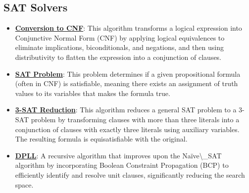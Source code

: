 \documentclass{article}%
\begin{document}
\subsection{SAT Solvers}%
\label{subsec:SATSolvers}%
\begin{itemize}[leftmargin=*]%
\item \href{https://purdue.brightspace.com/d2l/common/assets/pdfjs-d2l-dist/1.0.14-legacy/web/viewer.html?file=\%2Fcontent\%2Fenforced\%2F1095467-wl.202510.CS.24300.001\%2F13L1-Logic.pdf\%3Fou\%3D1095467\&lang=en-us\&container=d2l-fileviewer-rendered-pdf\&fullscreen=d2l-fileviewer-rendered-pdf-dialog\&height=667#page=17}{\textbf{Conversion to CNF}}: This algorithm transforms a logical expression into Conjunctive Normal Form (CNF) by applying logical equivalences to eliminate implications, biconditionals, and negations, and then using distributivity to flatten the expression into a conjunction of clauses.%
\item \href{https://purdue.brightspace.com/d2l/common/assets/pdfjs-d2l-dist/1.0.14-legacy/web/viewer.html?file=\%2Fcontent\%2Fenforced\%2F1095467-wl.202510.CS.24300.001\%2F13L1-Logic.pdf\%3Fou\%3D1095467\&lang=en-us\&container=d2l-fileviewer-rendered-pdf\&fullscreen=d2l-fileviewer-rendered-pdf-dialog\&height=667#page=15}{\textbf{SAT Problem}}: This problem determines if a given propositional formula (often in CNF) is satisfiable, meaning there exists an assignment of truth values to its variables that makes the formula true.%
\item \href{https://purdue.brightspace.com/d2l/common/assets/pdfjs-d2l-dist/1.0.14-legacy/web/viewer.html?file=\%2Fcontent\%2Fenforced\%2F1095467-wl.202510.CS.24300.001\%2F13L1-Logic.pdf\%3Fou\%3D1095467\&lang=en-us\&container=d2l-fileviewer-rendered-pdf\&fullscreen=d2l-fileviewer-rendered-pdf-dialog\&height=667#page=24}{\textbf{3-SAT Reduction}}: This algorithm reduces a general SAT problem to a 3-SAT problem by transforming clauses with more than three literals into a conjunction of clauses with exactly three literals using auxiliary variables. The resulting formula is equisatisfiable with the original.%
\item \href{https://purdue.brightspace.com/d2l/common/assets/pdfjs-d2l-dist/1.0.14-legacy/web/viewer.html?file=\%2Fcontent\%2Fenforced\%2F1095467-wl.202510.CS.24300.001\%2F15L2-SAT.pdf\%3Fou\%3D1095467\&lang=en-us\&container=d2l-fileviewer-rendered-pdf\&fullscreen=d2l-fileviewer-rendered-pdf-dialog\&height=667#page=17}{\textbf{DPLL}}: A recursive algorithm that improves upon the Naïve\textbackslash{}_SAT algorithm by incorporating Boolean Constraint Propagation (BCP) to efficiently identify and resolve unit clauses, significantly reducing the search space.%

\end{itemize}
\end{document}
